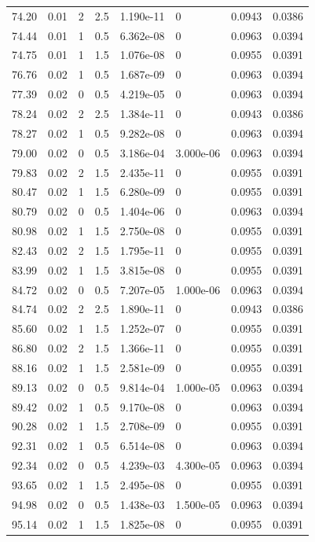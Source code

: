 \documentclass[preview]{standalone}
\begin{document}
{{{\begin{tabular}{L{1.2cm}C{1.2cm} C{0.3cm}C{0.5cm} C{1.4cm}C{1.4cm} C{1.4cm}C{1.4cm}}
  74.20  &  0.01  & 2     & 2.5 &  1.190e-11  & 0  & 0.0943 &  0.0386   \\ 
  74.44  &  0.01  & 1     & 0.5 &  6.362e-08  & 0  & 0.0963 &  0.0394   \\ 
  74.75  &  0.01  & 1     & 1.5 &  1.076e-08  & 0  & 0.0955 &  0.0391   \\ 
  76.76  &  0.02  & 1     & 0.5 &  1.687e-09  & 0  & 0.0963 &  0.0394   \\ 
  77.39  &  0.02  & 0     & 0.5 &  4.219e-05  & 0  & 0.0963 &  0.0394   \\ 
  78.24  &  0.02  & 2     & 2.5 &  1.384e-11  & 0  & 0.0943 &  0.0386   \\ 
  78.27  &  0.02  & 1     & 0.5 &  9.282e-08  & 0  & 0.0963 &  0.0394   \\ 
  79.00  &  0.02  & 0     & 0.5 &  3.186e-04  & 3.000e-06  & 0.0963 &  0.0394   \\ 
  79.83  &  0.02  & 2     & 1.5 &  2.435e-11  & 0  & 0.0955 &  0.0391   \\ 
  80.47  &  0.02  & 1     & 1.5 &  6.280e-09  & 0  & 0.0955 &  0.0391   \\ 
  80.79  &  0.02  & 0     & 0.5 &  1.404e-06  & 0  & 0.0963 &  0.0394   \\ 
  80.98  &  0.02  & 1     & 1.5 &  2.750e-08  & 0  & 0.0955 &  0.0391   \\ 
  82.43  &  0.02  & 2     & 1.5 &  1.795e-11  & 0  & 0.0955 &  0.0391   \\ 
  83.99  &  0.02  & 1     & 1.5 &  3.815e-08  & 0  & 0.0955 &  0.0391   \\ 
  84.72  &  0.02  & 0     & 0.5 &  7.207e-05  & 1.000e-06  & 0.0963 &  0.0394   \\ 
  84.74  &  0.02  & 2     & 2.5 &  1.890e-11  & 0  & 0.0943 &  0.0386   \\ 
  85.60  &  0.02  & 1     & 1.5 &  1.252e-07  & 0  & 0.0955 &  0.0391   \\ 
  86.80  &  0.02  & 2     & 1.5 &  1.366e-11  & 0  & 0.0955 &  0.0391   \\ 
  88.16  &  0.02  & 1     & 1.5 &  2.581e-09  & 0  & 0.0955 &  0.0391   \\ 
  89.13  &  0.02  & 0     & 0.5 &  9.814e-04  & 1.000e-05  & 0.0963 &  0.0394   \\ 
  89.42  &  0.02  & 1     & 0.5 &  9.170e-08  & 0  & 0.0963 &  0.0394   \\ 
  90.28  &  0.02  & 1     & 1.5 &  2.708e-09  & 0  & 0.0955 &  0.0391   \\ 
  92.31  &  0.02  & 1     & 0.5 &  6.514e-08  & 0  & 0.0963 &  0.0394   \\ 
  92.34  &  0.02  & 0     & 0.5 &  4.239e-03  & 4.300e-05  & 0.0963 &  0.0394   \\ 
  93.65  &  0.02  & 1     & 1.5 &  2.495e-08  & 0  & 0.0955 &  0.0391   \\ 
  94.98  &  0.02  & 0     & 0.5 &  1.438e-03  & 1.500e-05  & 0.0963 &  0.0394   \\ 
  95.14  &  0.02  & 1     & 1.5 &  1.825e-08  & 0  & 0.0955 &  0.0391   \\ 
\hline 
\end{tabular} 

}}}
\end{document}
